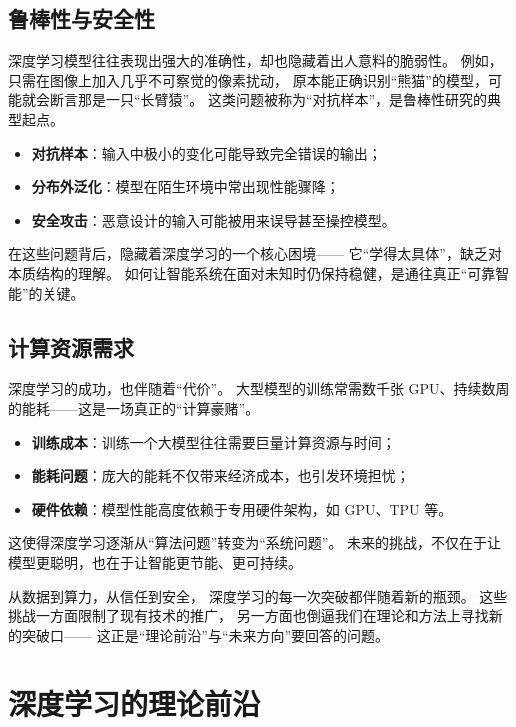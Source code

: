 \subsection{鲁棒性与安全性}

深度学习模型往往表现出强大的准确性，却也隐藏着出人意料的脆弱性。  
例如，只需在图像上加入几乎不可察觉的像素扰动，  
原本能正确识别“熊猫”的模型，可能就会断言那是一只“长臂猿”。  
这类问题被称为“对抗样本”，是鲁棒性研究的典型起点。

\begin{itemize}
\item \textbf{对抗样本}：输入中极小的变化可能导致完全错误的输出；
\item \textbf{分布外泛化}：模型在陌生环境中常出现性能骤降；
\item \textbf{安全攻击}：恶意设计的输入可能被用来误导甚至操控模型。
\end{itemize}

在这些问题背后，隐藏着深度学习的一个核心困境——  
它“学得太具体”，缺乏对本质结构的理解。  
如何让智能系统在面对未知时仍保持稳健，是通往真正“可靠智能”的关键。

\subsection{计算资源需求}

深度学习的成功，也伴随着“代价”。  
大型模型的训练常需数千张 GPU、持续数周的能耗——这是一场真正的“计算豪赌”。  

\begin{itemize}
\item \textbf{训练成本}：训练一个大模型往往需要巨量计算资源与时间；
\item \textbf{能耗问题}：庞大的能耗不仅带来经济成本，也引发环境担忧；
\item \textbf{硬件依赖}：模型性能高度依赖于专用硬件架构，如 GPU、TPU 等。
\end{itemize}

这使得深度学习逐渐从“算法问题”转变为“系统问题”。  
未来的挑战，不仅在于让模型更聪明，也在于让智能更节能、更可持续。

从数据到算力，从信任到安全，  
深度学习的每一次突破都伴随着新的瓶颈。  
这些挑战一方面限制了现有技术的推广，  
另一方面也倒逼我们在理论和方法上寻找新的突破口——  
这正是“理论前沿”与“未来方向”要回答的问题。

\section{深度学习的理论前沿}

